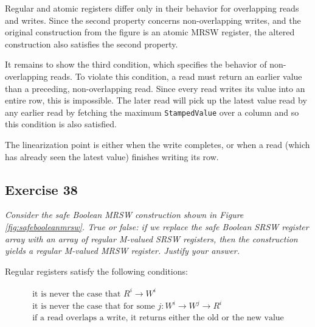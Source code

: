 \documentclass[a4paper,10pt]{article}
\begin{document}
Regular and atomic registers differ only in their behavior for overlapping reads
and writes. Since the second property concerns non-overlapping writes, and the original
construction from the figure is an atomic MRSW register, the altered construction
also satisfies the second property.

It remains to show the third condition, which specifies the behavior of non-overlapping
reads. To violate this condition, a read must return an earlier value than a preceding,
non-overlapping read. Since every read writes its value into an entire row, this is impossible.
The later read will pick up the latest value read by any earlier read by fetching
the maximum \lstinline|StampedValue| over a column and so this condition is also satisfied.

The linearization point is either when the write completes, or when a read (which has 
already seen the latest value) finishes writing its row.

\begin{comment}
The construction which we arrive at by substituting the array of atomic registers 
\lstinline|a_table| with an array of regular registers \lstinline|r_table| does not
yield an atomic MRSW register.

We only need to show that the third condition is not satisfied; \lstinline|read()|
determines some value from \lstinline|r_table|, which is returned as the result.
However, since the value is taken from a regular register (which does not necessarily
satisify the third condition), this value is also not guaranteed to satisfy it.
\end{comment}


\subsection{Exercise 38}

\emph{Consider the safe Boolean MRSW construction shown in Figure \ref{fig:safebooleanmrsw}.
True or false: if we replace the safe Boolean SRSW register array with an array
of regular M-valued SRSW registers, then the construction yields a regular
M-valued MRSW register. Justify your answer.}

\vspace{3mm}

Regular registers satisfy the following conditions:

\begin{gather}
\text{it is never the case that } R^i \rightarrow W^i \\
\text{it is never the case that for some } j: W^i \rightarrow W^j \rightarrow R^i \\
\text{if a read overlaps a write, it returns either the old or the new value}
\end{gather}
\end{document}
